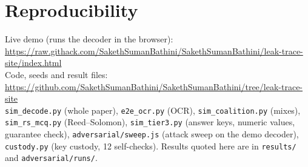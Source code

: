 \documentclass[10pt,a4paper]{article}
\theoremstyle{remark}
\begin{document}
\section{Reproducibility}
\label{app:repro}
Live demo (runs the decoder in the browser):\\
\url{https://raw.githack.com/SakethSumanBathini/SakethSumanBathini/leak-trace-site/index.html}\\
Code, seeds and result files: \url{https://github.com/SakethSumanBathini/SakethSumanBathini/tree/leak-trace-site}\\
\texttt{sim\_decode.py} (whole paper), \texttt{e2e\_ocr.py} (OCR), \texttt{sim\_coalition.py} (mixes), \texttt{sim\_rs\_mcq.py} (Reed--Solomon), \texttt{sim\_tier3.py} (answer keys, numeric values, guarantee check), \texttt{adversarial/sweep.js} (attack sweep on the demo decoder), \texttt{custody.py} (key custody, 12 self-checks). Results quoted here are in \texttt{results/} and \texttt{adversarial/runs/}.
\end{document}
